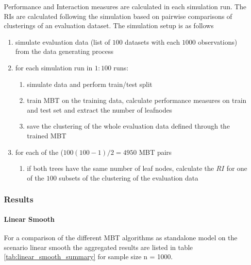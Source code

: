 Performance and Interaction measures are calculated in each simulation run.  
The RIs are calculated following the simulation based on pairwise comparisons of clusterings of an evaluation dataset. The simulation setup is as follows

\begin{enumerate}
    \item simulate evaluation data (list of $100$ datasets with each $1000$ observations) from the data generating process
    \item for each simulation run in $1:100$ runs:
    \begin{enumerate}
        \item simulate data and perform train/test split
        \item train MBT on the training data, calculate performance measures on train and test set and extract the number of leafnodes
        \item save the clustering of the whole evaluation data defined through the trained MBT
    \end{enumerate}
    \item for each of the ($100(100-1)/2 = 4950$ MBT pairs
    \begin{enumerate}
        \item if both trees have the same number of leaf nodes, calculate the $RI$ for one of the $100$ subsets of the clustering of the evaluation data
    \end{enumerate}
\end{enumerate}

\subsubsection{Results}
\paragraph{Linear Smooth}
For a comparison of the different MBT algorithms as standalone model on the scenario linear smooth the aggregated results are listed in table \ref{tab:linear_smooth_summary} for sample size n = 1000. 

